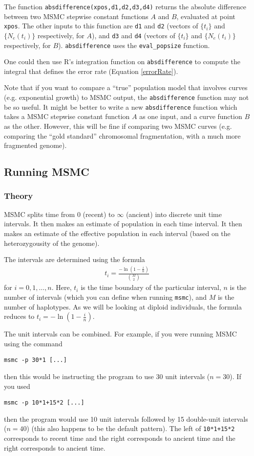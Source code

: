 \documentclass[11pt,a4paper]{article}
\begin{document}
The function \texttt{absdifference(xpos,d1,d2,d3,d4)} returns the absolute difference between two MSMC stepwise constant functions $A$ and $B$, evaluated at point \texttt{xpos}. The other inputs to this function are \texttt{d1} and \texttt{d2} (vectors of $\{t_i\}$ and $\{N_e(t_i)\}$ respectively, for $A$), and \texttt{d3} and \texttt{d4} (vectors of $\{t_i\}$ and $\{N_e(t_i)\}$ respectively, for $B$). \texttt{absdifference} uses the \texttt{eval\_popsize} function.

One could then use R's integration function on \texttt{absdifference} to compute the integral that defines the error rate (Equation \ref{errorRate}).

Note that if you want to compare a ``true''  population model that involves curves (e.g. exponential growth) to MSMC output, the \texttt{absdifference} function may not be so useful. It might be better to write a new \texttt{absdifference} function which takes a MSMC stepwise constant function $A$ as one input, and a curve function $B$ as the other. However, this will be fine if comparing two MSMC curves (e.g. comparing the ``gold standard'' chromosomal fragmentation, with a much more fragmented genome).

\subsection{Running MSMC}
\subsubsection{Theory}
MSMC splits time from 0 (recent) to $\infty$ (ancient) into discrete unit time intervals. It then makes an estimate of population in each time interval. It then makes an estimate of the effective population in each interval (based on the heterozygousity of the genome).

The intervals are determined using the formula
\begin{eqnarray}
  t_i = \frac{-\ln (1-\frac{i}{n})}{{M\choose 2}} \label{timeInts}
\end{eqnarray}
for $i = 0, 1, \dots, n$. Here, $t_i$ is the time boundary of the particular interval, $n$ is the number of intervals (which you can define when running \texttt{msmc}), and $M$ is the number of haplotypes. As we will be looking at diploid individuals, the formula reduces to $t_i = -\ln (1-\frac{i}{n})$.

The unit intervals can be combined. For example, if you were running MSMC using the command 
\begin{lstlisting}
msmc -p 30*1 [...]
\end{lstlisting}
then this would be instructing the program to use 30 unit intervals ($n = 30$). If you used 
\begin{lstlisting}
msmc -p 10*1+15*2 [...]
\end{lstlisting}
then the program would use 10 unit intervals followed by 15 double-unit intervals ($n = 40$) (this also happens to be the default pattern). The left of \texttt{10*1+15*2} corresponds to recent time and the right corresponds to ancient time and the right corresponds to ancient time.
\end{document}
